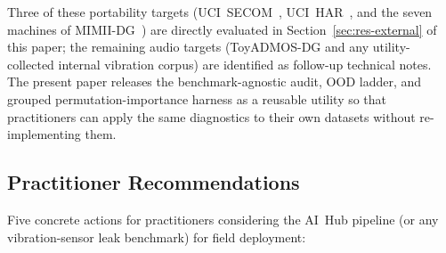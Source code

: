 \documentclass[3p,times,authoryear]{elsarticle}
\theoremstyle{remark}
\begin{document}
\begin{table}[!htbp]
\caption{Portability of the four-probe shortcut audit and
three-tier OOD ladder to four representative sensor-ML
benchmarks. The audit instantiation is benchmark-specific
(``identifier'' column varies); the ladder instantiation
follows from the available group hierarchy. External
validation of the methodology on these benchmarks is identified
as the immediate future-work
priority.\label{tab:portability}}
\centering
\scriptsize
\setlength{\tabcolsep}{2pt}
\end{table}

Three of these portability targets
(UCI~SECOM~\cite{mccann2008secom},
UCI~HAR~\cite{anguita2013har}, and the seven machines of
MIMII-DG~\cite{dohi2022mimii}) are
directly evaluated in Section~\ref{sec:res-external} of this
paper; the remaining audio targets (ToyADMOS-DG and any
utility-collected internal vibration corpus) are identified as
follow-up technical notes. The present paper releases the
benchmark-agnostic audit, OOD ladder, and grouped
permutation-importance harness as a reusable utility so that
practitioners can apply the same diagnostics to their own
datasets without re-implementing them.

\subsection{Practitioner Recommendations}

Five concrete actions for practitioners considering the
AI~Hub pipeline (or any vibration-sensor leak benchmark) for
field deployment:
\end{document}
